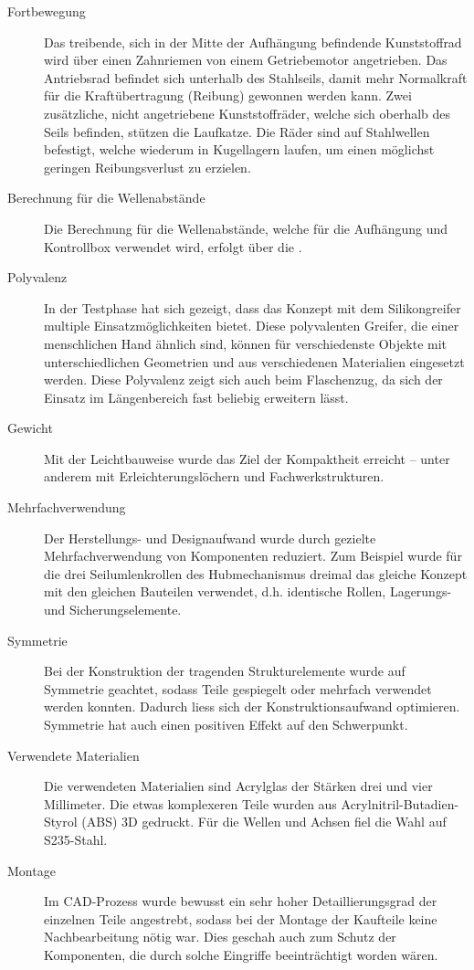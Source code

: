 \begin{description}
    \item[Fortbewegung] Das treibende, sich in der Mitte der Aufhängung befindende Kunststoffrad wird über einen Zahnriemen von einem Getriebemotor angetrieben. Das Antriebsrad befindet sich unterhalb des Stahlseils, damit mehr Normalkraft für die Kraftübertragung (Reibung) gewonnen werden kann. Zwei zusätzliche, nicht angetriebene Kunststoffräder, welche sich oberhalb des Seils befinden, stützen die Laufkatze. Die Räder sind auf Stahlwellen befestigt, welche wiederum in Kugellagern laufen, um einen möglichst geringen Reibungsverlust zu erzielen.
    \item[Berechnung für die Wellenabstände] Die Berechnung für die Wellenabstände, welche für die Aufhängung und Kontrollbox verwendet wird, erfolgt über die  \cite[Kapitel 16, Formel 22]{roloff-matek}.
    \item[Polyvalenz] In der Testphase hat sich gezeigt, dass das Konzept mit dem Silikongreifer multiple Einsatzmöglichkeiten bietet. Diese polyvalenten Greifer, die einer menschlichen Hand ähnlich sind, können für verschiedenste Objekte mit unterschiedlichen Geometrien und aus verschiedenen Materialien eingesetzt werden. Diese Polyvalenz zeigt sich auch beim Flaschenzug, da sich der Einsatz im Längenbereich fast beliebig erweitern lässt.
    \item[Gewicht] Mit der Leichtbauweise wurde das Ziel der Kompaktheit erreicht -- unter anderem mit Erleichterungslöchern und Fachwerkstrukturen.
    \item[Mehrfachverwendung] Der Herstellungs- und Designaufwand wurde durch gezielte Mehrfachverwendung von Komponenten reduziert. Zum Beispiel wurde für die drei Seilumlenkrollen des Hubmechanismus dreimal das gleiche Konzept mit den gleichen Bauteilen verwendet, d.h. identische Rollen, Lagerungs- und Sicherungselemente.
    \item[Symmetrie] Bei der Konstruktion der tragenden Strukturelemente wurde auf Symmetrie geachtet, sodass Teile gespiegelt oder mehrfach verwendet werden konnten. Dadurch liess sich der Konstruktionsaufwand optimieren. Symmetrie hat auch einen positiven Effekt auf den Schwerpunkt.
    \item[Verwendete Materialien] Die verwendeten Materialien sind Acrylglas der Stärken drei und vier Millimeter. Die etwas komplexeren Teile wurden aus Acrylnitril-Butadien-Styrol (ABS) 3D gedruckt. Für die Wellen und Achsen fiel die Wahl auf S235-Stahl.
    \item[Montage] Im CAD-Prozess wurde bewusst ein sehr hoher Detaillierungsgrad der einzelnen Teile angestrebt, sodass bei der Montage der Kaufteile keine Nachbearbeitung nötig war. Dies geschah auch zum Schutz der Komponenten, die durch solche Eingriffe beeinträchtigt worden wären.
\end{description}

